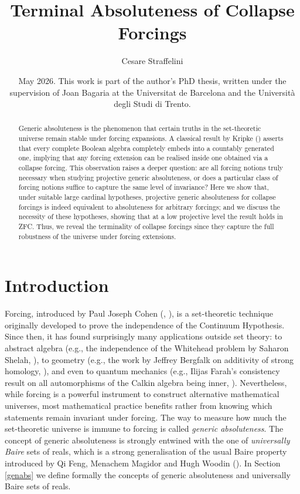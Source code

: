 \documentclass[10pt]{amsart}
\title{{Terminal} Absoluteness of Collapse Forcings}
\author{Cesare Straffelini}
\date{May 2026. This work is part of the author's PhD thesis, written under the supervision of Joan Bagaria at the Universitat de Barcelona and the Università degli Studi di Trento.}
\theoremstyle{definition}
\begin{document}
\begin{abstract}
Generic absoluteness is the phenomenon that certain truths in the set-theoretic universe remain stable under forcing expansions. A classical result by Kripke (\cite{Kripke}) asserts that every complete Boolean algebra completely embeds into a countably generated one, implying that any forcing extension can be realised inside one obtained via a collapse forcing. This observation raises a deeper question: are all forcing notions truly necessary when studying projective generic absoluteness, or does a particular class of forcing notions suffice to capture the same level of invariance? Here we show that, under suitable large cardinal hypotheses, projective generic absoluteness for collapse forcings is indeed equivalent to absoluteness for arbitrary forcings; and we discuss the necessity of these hypotheses, showing that at a low projective level the result holds in ZFC. Thus, we reveal the {terminality} of collapse forcings since they capture the full robustness of the universe under forcing extensions.
\end{abstract}

\maketitle

\section{Introduction}

Forcing, introduced by Paul Joseph Cohen (\cite{Cohen}, \cite{Cohen2}), is a set-theoretic technique originally developed to prove the independence of the Continuum Hypothesis. Since then, it has found surprisingly many applications outside set theory: to abstract algebra (e.g., the independence of the Whitehead problem by Saharon Shelah, \cite{shelah}), to geometry (e.g., the work by Jeffrey Bergfalk on additivity of strong homology, \cite{jeff}), and even to quantum mechanics (e.g., Ilijas Farah's consistency result on all automorphisms of the Calkin algebra being inner, \cite{Farah}). Nevertheless, while forcing is a powerful instrument to construct alternative mathematical universes, most mathematical practice benefits rather from knowing which statements remain invariant under forcing. The way to measure how much the set-theoretic universe is immune to forcing is called \emph{generic absoluteness}. The concept of generic absoluteness is strongly entwined with the one of \emph{universally Baire} sets of reals, which is a strong generalisation of the usual Baire property introduced by Qi Feng, Menachem Magidor and Hugh Woodin (\cite{FMW}). In Section \ref{genabs} we define formally the concepts of generic absoluteness and universally Baire sets of reals.\medskip
\end{document}
